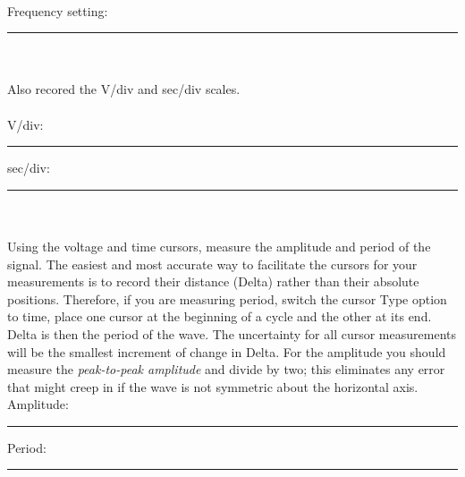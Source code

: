 \\
Frequency setting: \rule{3cm}{.1mm}\\
\\
Also recored the V/div and sec/div scales.\\
\\
V/div:  \rule{3cm}{.1mm} \hspace*{1cm} sec/div: \rule{3cm}{.1mm}\\
\\
Using the voltage and time cursors, measure the amplitude and period of the
signal. The easiest and most accurate way to facilitate the cursors for your
measurements is to record their distance (Delta) rather than their absolute
positions. Therefore, if you are measuring period, switch the cursor Type
option to time, place one cursor at the beginning of a cycle and the other at
its end. Delta is then the period of the wave. The uncertainty for all cursor
measurements will be the smallest increment of change in Delta. For the
amplitude you should measure the {\it peak-to-peak amplitude} and divide by
two; this eliminates any error that might creep in if the wave is not symmetric
about the horizontal axis.
\\
\vfill
Amplitude:  \rule{3cm}{.1mm} \hspace*{1cm} Period: \rule{3cm}{.1mm}\\
\pagebreak

